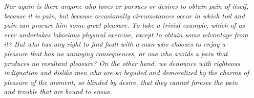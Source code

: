 \documentclass[12pt]{mwbk}
\theoremstyle{plain}
\theoremstyle{definition}
\theoremstyle{remark}
\begin{document}
\bigskip

{\it
Nor again is there anyone who loves or pursues or desires to obtain
pain of itself, because it is pain, but because occasionally
circumstances occur in which toil and pain can procure him some great
pleasure. To take a trivial example, which of us ever undertakes
laborious physical exercise, except to obtain some advantage from it?
But who has any right to find fault with a man who chooses to enjoy a
pleasure that has no annoying consequences, or one who avoids a pain
that produces no resultant pleasure?
On the other hand, we denounce with righteous indignation and dislike
men who are so beguiled and demoralized by the charms of pleasure of
the moment, so blinded by desire, that they cannot foresee the pain
and trouble that are bound to ensue.
}
\end{document}
